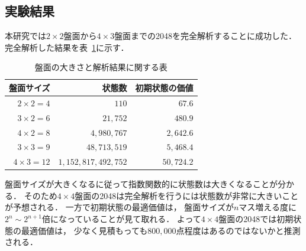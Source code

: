 \subsection{実験結果}
本研究では$2\times2$盤面から$4\times3$盤面までの2048を完全解析することに成功した．
完全解析した結果を表~\ref{table: analysis_table}に示す．
\begin{table}[t]
    \centering
    \begin{tabular}{rrr}
        \hline \hline
        盤面サイズ & 状態数 & 初期状態の価値\\ \hline
        $2\times2=4$ & $110$ & $67.6$ \\
        $3\times2=6$ & $21,752$ & $480.9$ \\
        $4\times2=8$ & $4,980,767$ & $2,642.6$ \\
        $3\times3=9$ & $48,713,519$ & $5,468.4$ \\
        $4\times3=12$ & $1,152,817,492,752$ & $50,724.2$ \\
        \hline
    \end{tabular}
    \caption{盤面の大きさと解析結果に関する表}
    \label{table: analysis_table}
\end{table}
盤面サイズが大きくなるに従って指数関数的に状態数は大きくなることが分かる．
そのため$4\times4$盤面の2048は完全解析を行うには状態数が非常に大きいことが予想される．
一方で初期状態の最適価値は， 盤面サイズが$n$マス増える度に$2^n \sim 2^{n+1}$倍になっていることが見て取れる．
よって$4\times4$盤面の2048では初期状態の最適価値は， 少なく見積もっても$800,000$点程度はあるのではないかと推測される．

